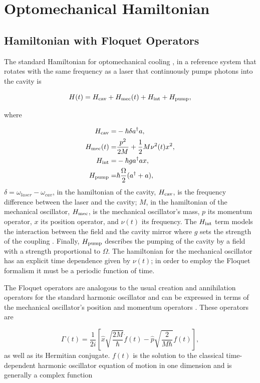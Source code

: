 \documentclass[reprint, amsmath,amssymb, aps,pra]{revtex4-1}
\begin{document}
\section{Optomechanical Hamiltonian}\label{OptmechH}
\subsection{Hamiltonian with Floquet Operators}
	
The standard Hamiltonian for optomechanical cooling \cite{LCNooshi}, in
a reference system that rotates with the same frequency as a laser
that continuously pumps photons into the cavity is

\begin{equation}
H(t) =   H_{\rm cav} + H_{\rm mec}(t) + H_{\rm int} + H_{\rm pump},
\end{equation}

where

\begin{align}
H_{\rm cav} =& -\hbar \delta a^\dagger a,\\
H_{\rm mec}(t) =& \frac{p^2}{2M} + \frac{1}{2}M \nu^2 (t) x^2,\\
H_{\rm int} =& -\hbar g a^\dagger a x,\\
H_{\rm pump} =& \hbar\frac{\Omega}{2}(a^\dagger + a),
\end{align}
$\delta = \omega_{laser} - \omega_{cav}$, in the hamiltonian of the
cavity, $H_{\rm cav}$, is the frequency difference between the laser and
the cavity; $M$, in the hamiltonian of the mechanical oscillator,
$H_{\rm mec}$, is the mechanical oscillator's mass, $p$ its momentum
operator, $x$ its position operator, and $\nu(t)$ its frequency. The
$H_{\rm int}$ term models the interaction between the field and the cavity
mirror where $g$ sets the strength of the coupling \cite{KippenberCO}.
Finally, $H_{\rm pump}$ describes the pumping of the cavity by a field with
a strength proportional to $\Omega$. The hamiltonian for the
mechanical oscillator has an explicit time dependence given by
$\nu(t)$; in order to employ the Floquet formalism it must be a
periodic function of time.

The Floquet operators are analogous to the usual creation and
annihilation operators for the standard harmonic oscillator and can be
expressed in terms of the mechanical oscillator's position and
momentum operators \cite{HanngiFM}. These operators are

\begin{equation}\label{FloquetOperators}
\Gamma(t) = \frac{1}{2i}\left[\hat{x}\sqrt{\frac{2M}{\hbar}}\dot{f}(t)-\hat{p}\sqrt{\frac{2}{M \hbar }}f(t)\right],
\end{equation} as well as its Hermitian conjugate. $f(t)$ is the solution to the classical time-dependent harmonic oscillator equation of motion in one dimension and is generally a complex function \cite{BrownPT}
\end{document}
